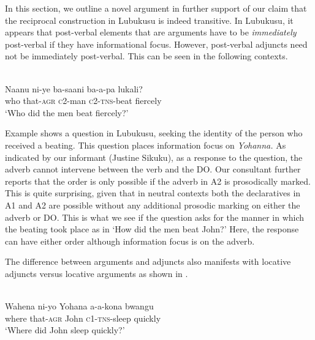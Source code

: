 \documentclass[output=paper]{langsci/langscibook}
\begin{document}
In this section, we outline a novel argument in further support of our claim that the reciprocal construction in Lubukusu is indeed transitive. In Lubukusu, it appears that post-verbal elements that are arguments have to be \textit{immediately} post-verbal if they have informational focus. However, post-verbal adjuncts need not be immediately post-verbal. This can be seen in the following contexts.



\ea\label{ex:safir:14}
\settowidth{}
  \\
\gll Naanu  ni-ye    ba-saani   ba-a-pa   lukali? \\
who  that-\textsc{agr}   \textsc{c}2-man   \textsc{c}2-\textsc{tns}-beat   fiercely\\
\glt ‘Who did the men beat fiercely?’ \\
\z
\z


Example  shows a question in Lubukusu, seeking the identity of the person who received a beating. This question places information focus on \textit{Yohanna.} As indicated by our informant (Justine Sikuku), as a response to the question, the adverb cannot intervene between the verb and the DO. Our consultant further reports that the order is only possible if the adverb in A2 is prosodically marked. This is quite surprising, given that in neutral contexts both the declaratives in A1 and A2 are possible without any additional prosodic marking on either the adverb or DO. This is what we see if the question asks for the manner in which the beating took place as in ‘How did the men beat John?’ Here, the response can have either order although information focus is on the adverb. 

The difference between arguments and adjuncts also manifests with locative adjuncts versus locative arguments as shown in .  


\ea\label{ex:safir:15}
\settowidth{}
  \\
\gll Wahena  ni-yo    Yohana  a-a-kona  bwangu \\
where     that-\textsc{agr}   John     \textsc{c1-tns}-sleep  quickly \\
\glt ‘Where did John sleep quickly?’ \\
\z
\z 
\end{document}
